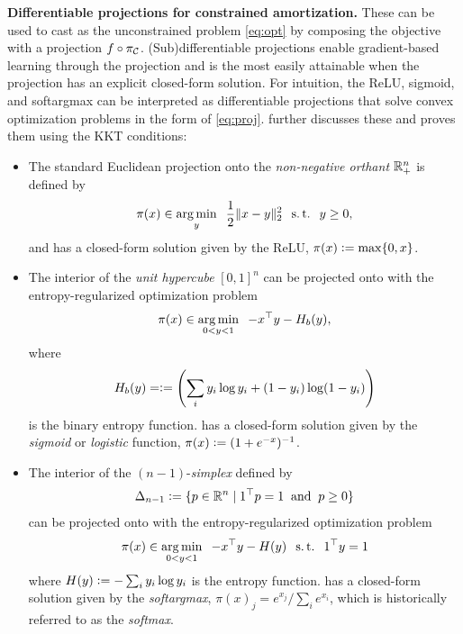 \textbf{Differentiable projections for constrained amortization.}
These can be used to cast  as the unconstrained
problem \cref{eq:opt} by composing the objective with a projection
$f\circ \pi_{\mathcal{C}}$.
(Sub)differentiable projections enable gradient-based learning through the projection
and is the most easily attainable when the projection has an explicit closed-form solution.
For intuition, the ReLU, sigmoid, and softargmax can be interpreted as
differentiable projections that solve convex optimization problems
in the form of \cref{eq:proj}.
\citet[\S2.4.4]{amos2019differentiable} further discusses these
and proves them using the KKT conditions:
\begin{itemize}
\item The standard Euclidean projection onto the
  \emph{non-negative orthant} $\mathbb{R}^n_+$ is defined by
  \begin{equation}
    \pi(x) \in \operatorname*{arg\,min}_y \;\; \frac{1}{2}\|x-y\|_2^2 \;\; \operatorname*{s.t.} \;\; y\geq 0,
    \label{eq:relu-proj}
  \end{equation}
  and has a closed-form solution given by the
  ReLU, \ie $\pi(x) \vcentcolon= \max\{0, x\}$.
\item The interior of the \emph{unit hypercube} $[0,1]^n$ can
  be projected onto with the entropy-regularized
  optimization problem
  \begin{equation}
    \pi(x) \in \operatorname*{arg\,min}_{0<y<1} \;\; -x^\top y -H_b(y),
    \label{eq:sigmoid-proj}
  \end{equation}
  where
  \begin{equation}
  H_b(y) = \vcentcolon= \left(\sum_i y_i\log y_i + (1-y_i)\log (1-y_i)\right)
  \end{equation}
  is the
  binary entropy function.
   has a closed-form solution given by
  the \emph{sigmoid} or \emph{logistic} function,
  \ie $\pi(x) \vcentcolon= (1+e^{-x})^{-1}$.
\item The interior of the $(n-1)$-\emph{simplex} defined by
  \begin{equation}
    \Delta_{n-1}\vcentcolon=\{p\in\mathbb{R}^n\; \vert\; 1^\top p = 1 \; \; {\rm and} \;\; p \geq 0 \}
    \label{eq:simplex}
  \end{equation}
  can be projected onto with the entropy-regularized
  optimization problem
  \begin{equation}
    \pi(x) \in \operatorname*{arg\,min}_{0<y<1} \;\; -x^\top y - H(y) \;\; \operatorname*{s.t.}\;\; 1^\top y = 1
    \label{eq:simplex-proj}
  \end{equation}
  where $H(y) \vcentcolon= -\sum_i y_i \log y_i$ is the entropy function.
   has a closed-form solution given by
  the \emph{softargmax}, \ie $\pi(x)_j = e^{x_j} / \sum_i e^{x_i}$,
  which is historically referred to as the \emph{softmax}.
\end{itemize}

